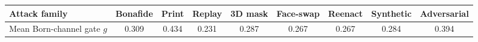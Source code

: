 \begin{tabular}{lcccccccc}
\toprule
Attack family & Bonafide & Print & Replay & 3D mask & Face-swap & Reenact & Synthetic & Adversarial \\
\midrule
Mean Born-channel gate $g$ & 0.309 & 0.434 & 0.231 & 0.287 & 0.267 & 0.267 & 0.284 & 0.394 \\
\bottomrule
\end{tabular}